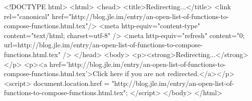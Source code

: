 <!DOCTYPE html>
<html>
<head>
<title>Redirecting...</title>
<link rel="canonical" href="http://blog.jle.im/entry/an-open-list-of-functions-to-compose-functions.html.tex"/>
<meta http-equiv="content-type" content="text/html; charset=utf-8" />
<meta http-equiv="refresh" content="0; url=http://blog.jle.im/entry/an-open-list-of-functions-to-compose-functions.html.tex" />
</head>
<body>
  <p><strong>Redirecting...</strong></p>
  <p><a href='http://blog.jle.im/entry/an-open-list-of-functions-to-compose-functions.html.tex'>Click here if you are not redirected.</a></p>
  <script>
    document.location.href = "http://blog.jle.im/entry/an-open-list-of-functions-to-compose-functions.html.tex";
  </script>
</body>
</html>
